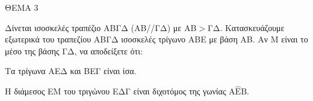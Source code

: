 
ΘΕΜΑ 3

Δίνεται ισοσκελές τραπέζιο ΑΒΓΔ (ΑΒ//ΓΔ) με ΑΒ$>$ΓΔ. Κατασκευάζουμε εξωτερικά του τραπεζίου ΑΒΓΔ ισοσκελές τρίγωνο ΑΒΕ με βάση ΑΒ. Αν Μ είναι το μέσο της βάσης ΓΔ, να αποδείξετε ότι:

\begin{alist}
\item Τα τρίγωνα ΑΕΔ και ΒΕΓ είναι ίσα.


\item Η διάμεσος ΕΜ του τριγώνου ΕΔΓ είναι διχοτόμος της γωνίας $\text{A}\widehat{\text{E}}\text{B}$.

\end{alist}
